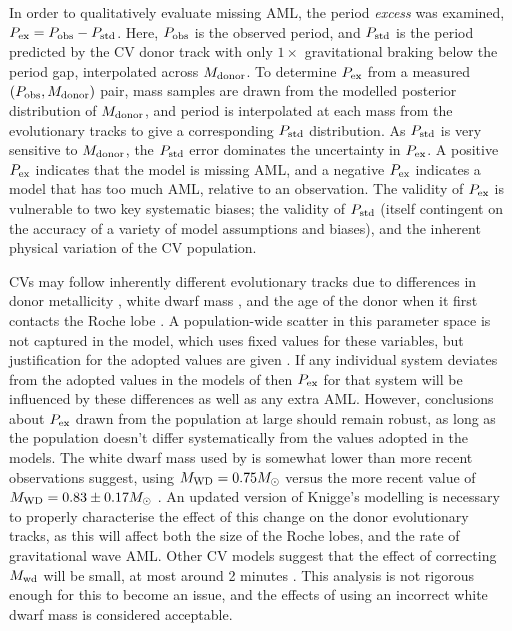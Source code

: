 In order to qualitatively evaluate missing AML, the period \textit{excess} was examined, $P_{\rm ex} = P_{\rm obs} - P_{\rm std}$. Here, $P_{\rm obs}$ is the observed period, and $P_{\rm std}$ is the period predicted by the \citet{knigge11} CV donor track with only $1\times$ gravitational braking below the period gap, interpolated across $M_{\rm donor}$.
To determine $P_{\rm ex}$ from a measured $(P_{\rm obs}, M_{\rm donor})$ pair, mass samples are drawn from the modelled posterior distribution of $M_{\rm donor}$, and period is interpolated at each mass from the evolutionary tracks to give a corresponding $P_{\rm std}$ distribution. As $P_{\rm std}$ is very sensitive to $M_{\rm donor}$, the $P_{\rm std}$ error dominates the uncertainty in $P_{\rm ex}$.
A positive $P_{\rm ex}$ indicates that the model is missing AML, and a negative $P_{\rm ex}$ indicates a model that has too much AML, relative to an observation.
The validity of $P_{\rm ex}$ is vulnerable to two key systematic biases; the validity of $P_{\rm std}$ (itself contingent on the accuracy of a variety of model assumptions and biases), and the inherent physical variation of the CV population.

CVs may follow inherently different evolutionary tracks due to differences in donor metallicity \citep{stehle1997, harrison2016}, white dwarf mass \citep{knigge2006}, and the age of the donor when it first contacts the Roche lobe \citep{howell2001}. A population-wide scatter in this parameter space is not captured in the \citet{knigge11} model, which uses fixed values for these variables, but justification for the adopted values are given \citep{knigge11, knigge2006}.
If any individual system deviates from the adopted values in the models of \citet{knigge11} then $P_{\rm ex}$ for that system will be influenced by these differences as well as any extra AML. However, conclusions about $P_{\rm ex}$ drawn from the population at large should remain robust, as long as the population doesn't differ systematically from the values adopted in the models.
The white dwarf mass used by \citet{knigge11} is somewhat lower than more recent observations suggest, using $M_{\rm WD} = 0.75 M_\odot$ versus the more recent value of $M_{\rm WD} = 0.83 \pm 0.17 M_\odot$ \citep{pala2020}.
An updated version of Knigge's modelling is necessary to properly characterise the effect of this change on the donor evolutionary tracks, as this will affect both the size of the Roche lobes, and the rate of gravitational wave AML.
Other CV models suggest that the effect of correcting $M_{\rm wd}$ will be small, at most around 2 minutes \citep{goliasch2015}. This analysis is not rigorous enough for this to become an issue, and the effects of using an incorrect white dwarf mass is considered acceptable.


